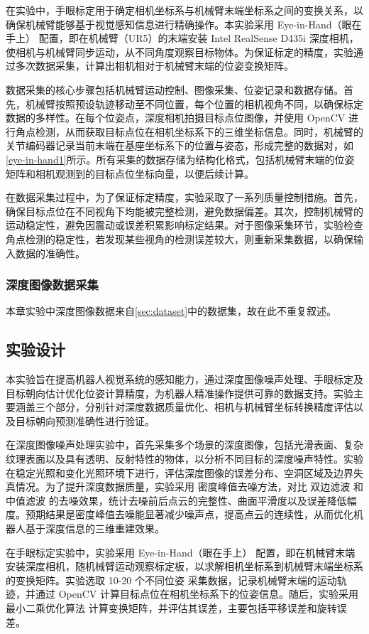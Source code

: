 在实验中，手眼标定用于确定相机坐标系与机械臂末端坐标系之间的变换关系，以确保机械臂能够基于视觉感知信息进行精确操作。本实验采用 Eye-in-Hand（眼在手上） 配置，即在机械臂（UR5）的末端安装 Intel RealSense D435i 深度相机，使相机与机械臂同步运动，从不同角度观察目标物体。为保证标定的精度，实验通过多次数据采集，计算出相机相对于机械臂末端的位姿变换矩阵。

数据采集的核心步骤包括机械臂运动控制、图像采集、位姿记录和数据存储。首先，机械臂按照预设轨迹移动至不同位置，每个位置的相机视角不同，以确保标定数据的多样性。在每个位姿点，深度相机拍摄目标点位图像，并使用 OpenCV 进行角点检测，从而获取目标点位在相机坐标系下的三维坐标信息。同时，机械臂的关节编码器记录当前末端在基座坐标系下的位置与姿态，形成完整的数据对，如\cref{eye-in-hand1}所示。所有采集的数据存储为结构化格式，包括机械臂末端的位姿矩阵和相机观测到的目标点位坐标向量，以便后续计算。

在数据采集过程中，为了保证标定精度，实验采取了一系列质量控制措施。首先，确保目标点位在不同视角下均能被完整检测，避免数据偏差。其次，控制机械臂的运动稳定性，避免因震动或误差积累影响标定结果。对于图像采集环节，实验检查角点检测的稳定性，若发现某些视角的检测误差较大，则重新采集数据，以确保输入数据的准确性。

\subsubsection{深度图像数据采集}
本章实验中深度图像数据来自\ref{sec:dataset}中的数据集，故在此不重复叙述。

\subsection{实验设计}
本实验旨在提高机器人视觉系统的感知能力，通过深度图像噪声处理、手眼标定及目标朝向估计优化位姿计算精度，为机器人精准操作提供可靠的数据支持。实验主要涵盖三个部分，分别针对深度数据质量优化、相机与机械臂坐标转换精度评估以及目标朝向预测准确性进行验证。

在深度图像噪声处理实验中，首先采集多个场景的深度图像，包括光滑表面、复杂纹理表面以及具有透明、反射特性的物体，以分析不同目标的深度噪声特性。实验在稳定光照和变化光照环境下进行，评估深度图像的误差分布、空洞区域及边界失真情况。为了提升深度数据质量，实验采用 密度峰值去噪方法，对比 双边滤波 和 中值滤波 的去噪效果，统计去噪前后点云的完整性、曲面平滑度以及误差降低幅度。预期结果是密度峰值去噪能显著减少噪声点，提高点云的连续性，从而优化机器人基于深度信息的三维重建效果。

在手眼标定实验中，实验采用 Eye-in-Hand（眼在手上） 配置，即在机械臂末端安装深度相机，随机械臂运动观察标定板，以求解相机坐标系到机械臂末端坐标系的变换矩阵。实验选取 10-20 个不同位姿 采集数据，记录机械臂末端的运动轨迹，并通过 OpenCV 计算目标点位在相机坐标系下的位姿信息。随后，实验采用最小二乘优化算法 计算变换矩阵，并评估其误差，主要包括平移误差和旋转误差。

